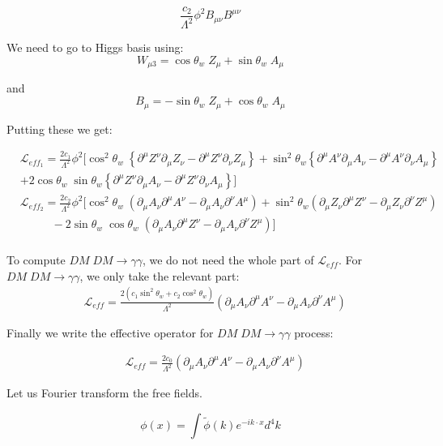 \documentclass[12pt]{report}
\begin{document}
$$\frac{c_2}{\Lambda^2} \phi^2 B_{\mu \nu} B^{\mu \nu}$$


We need to go to Higgs basis using:
$$W_{\mu 3} = \cos\theta_w\; Z_\mu +\sin\theta_w\; A_\mu$$

and
$$B_\mu= -\sin\theta_w\; Z_\mu + \cos\theta_w \; A_\mu $$

Putting these we get:

\begin{align*}
&\mathscr{L}_{eff_1}=\frac{2c_1}{\Lambda^2} \phi^2 [\cos^2\theta_w\; \left\{ \partial^\mu Z^\nu \partial_\mu Z_\nu- \partial^\mu Z^\nu \partial_\nu Z_\mu \right\}+\sin^2\theta_w \left\{ \partial^\mu A^\nu \partial_\mu A_\nu - \partial^\mu A^\nu \partial_\nu A_\mu  \right\} \\
&+2 \cos\theta_w \; \sin\theta_w \left\{ \partial^\mu Z^\nu \partial_\mu A_\nu - \partial^\mu Z^\nu \partial_\nu A_\mu \right\} ]\\
&\mathscr{L}_{eff_2}=\frac{2c_2}{\Lambda^2} \phi^2 [\cos^2\theta_w \; (\partial_\mu A_\nu \partial^\mu A^\nu-\partial_\mu A_\nu \partial^\nu A^\mu)+\sin^2\theta_w(\partial_\mu Z_\nu \partial^\mu Z^\nu - \partial_\mu Z_\nu \partial^\nu Z^\mu)\\
&\;\;\;\;\;\;\;\;\;\; -2 \sin\theta_w \; \cos\theta_w \; (\partial_\mu A_\nu \partial^\mu Z^\nu-\partial_\mu A_\nu \partial^\nu Z^\mu)]\\
\end{align*}





To compute $DM\; DM \longrightarrow \gamma \gamma$, we do not need the whole part of $\mathscr{L}_{eff}$.  For $DM \; DM \longrightarrow \gamma \gamma$, we only take the relevant part:
\begin{align}
&\mathscr{L}_{eff}= \frac{2(c_1\sin^2\theta_w +c_2 \cos^2\theta_w)}{\Lambda^2} (\partial_\mu A_\nu \partial^\mu A^\nu-\partial_\mu A_\nu \partial^\nu A^\mu)
\end{align}


Finally we write the effective operator for $DM \; DM \longrightarrow \gamma \gamma$ process:

\begin{align}
&\mathscr{L}_{eff}= \frac{2c_0}{\Lambda^2} (\partial_\mu A_\nu \partial^\mu A^\nu-\partial_\mu A_\nu \partial^\nu A^\mu)
\end{align}


Let us Fourier transform the free fields.

$$ \phi(x) = \int \tilde{\phi}(k) e^{-i k \cdot x} d^4k$$
\end{document}
